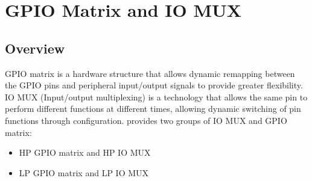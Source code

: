 \documentclass[main\_\_EN.tex]{subfiles}
\begin{document}

\ifglobal
\else
    {\let\clearpage\relax \listoftodos}
    {\let\clearpage\relax \listofdonetodos}
    \tableofcontents
    \listoftables
    \listoffigures
\fi



\hypertarget{iomuxgpio}{}
\chapter{GPIO Matrix and IO MUX}
\label{mod:iomuxgpio}


\section{Overview}
GPIO matrix is a hardware structure that allows dynamic remapping between the GPIO pins and peripheral input/output signals to provide greater flexibility. IO MUX (Input/output multiplexing) is a technology that allows the same pin to perform different functions at different times, allowing dynamic switching of pin functions through configuration. \chipname{} provides two groups of IO MUX and GPIO matrix:
\begin{itemize}
    \item HP GPIO matrix and HP IO MUX
    \item LP GPIO matrix and LP IO MUX
\end{itemize}
\end{document}
